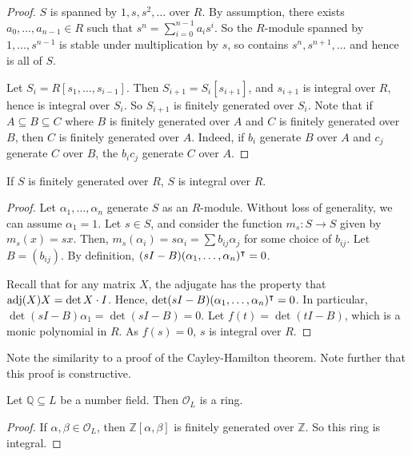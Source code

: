 \begin{proof}
    \( S \) is spanned by \( 1, s, s^2, \dots \) over \( R \).
    By assumption, there exists \( a_0, \dots, a_{n-1} \in R \) such that \( s^n = \sum_{i=0}^{n-1} a_i s^i \).
    So the \( R \)-module spanned by \( 1, \dots, s^{n-1} \) is stable under multiplication by \( s \), so contains \( s^n, s^{n+1}, \dots \) and hence is all of \( S \).

    Let \( S_i = R[s_1, \dots, s_{i-1}] \).
    Then \( S_{i+1} = S_i[s_{i+1}] \), and \( s_{i+1} \) is integral over \( R \), hence is integral over \( S_i \).
    So \( S_{i+1} \) is finitely generated over \( S_i \).
    Note that if \( A \subseteq B \subseteq C \) where \( B \) is finitely generated over \( A \) and \( C \) is finitely generated over \( B \), then \( C \) is finitely generated over \( A \).
    Indeed, if \( b_i \) generate \( B \) over \( A \) and \( c_j \) generate \( C \) over \( B \), the \( b_i c_j \) generate \( C \) over \( A \).
\end{proof}
\begin{theorem}
    If \( S \) is finitely generated over \( R \), \( S \) is integral over \( R \).
\end{theorem}
\begin{proof}
    Let \( \alpha_1, \dots, \alpha_n \) generate \( S \) as an \( R \)-module.
    Without loss of generality, we can assume \( \alpha_1 = 1 \).
    Let \( s \in S \), and consider the function \( m_s \colon S \to S \) given by \( m_s(x) = sx \).
    Then, \( m_s(\alpha_i) = s\alpha_i = \sum b_{ij} \alpha_j \) for some choice of \( b_{ij} \).
    Let \( B = (b_{ij}) \).
    By definition, \( (sI - B) (\alpha_1, \dots, \alpha_n)^\intercal = 0 \).

    Recall that for any matrix \( X \), the adjugate has the property that \( \operatorname{adj}(X) X = \det X \cdot I \).
    Hence, \( \det(sI - B) (\alpha_1, \dots, \alpha_n)^\intercal = 0 \).
    In particular, \( \det(sI - B) \alpha_1 = \det(sI - B) = 0 \).
    Let \( f(t) = \det(tI - B) \), which is a monic polynomial in \( R \).
    As \( f(s) = 0 \), \( s \) is integral over \( R \).
\end{proof}
Note the similarity to a proof of the Cayley-Hamilton theorem.
Note further that this proof is constructive.
\begin{corollary}
    Let \( \mathbb Q \subseteq L \) be a number field.
    Then \( \mathcal O_L \) is a ring.
\end{corollary}
\begin{proof}
    If \( \alpha, \beta \in \mathcal O_L \), then \( \mathbb Z[\alpha, \beta] \) is finitely generated over \( \mathbb Z \).
    So this ring is integral.
\end{proof}
